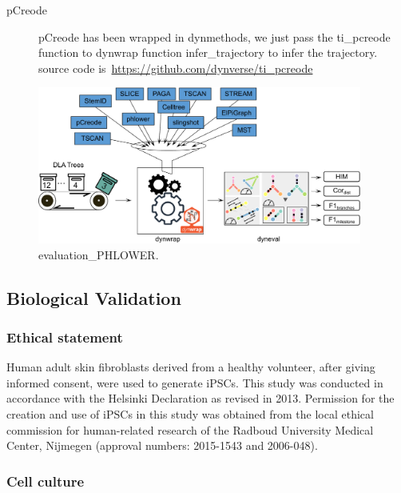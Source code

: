 \begin{description}
	\item[pCreode] 
	pCreode has been wrapped in dynmethods, we just pass the ti\_pcreode function to dynwrap function infer\_trajectory to infer the trajectory. source code is~\url{https://github.com/dynverse/ti\_pcreode}
\end{description}

\begin{figure}[!ht]
	\centering
	\includegraphics[width=0.95\textwidth]{evaluation_PHLOWER/fig}
	\vspace{0.1cm}
	\caption[evaluation\_PHLOWER]{
	evaluation\_PHLOWER.}
	\label{fig:evaluation_PHLOWER}
\end{figure}



\subsection{Biological Validation}


\subsubsection{Ethical statement}

Human adult skin fibroblasts derived from a healthy volunteer, after giving informed consent, were used to generate iPSCs. This study was conducted in accordance with the Helsinki Declaration as revised in 2013. Permission for the creation and use of iPSCs in this study was obtained from the local ethical commission for human-related research of the Radboud University Medical Center, Nijmegen (approval numbers: 2015-1543 and 2006-048). 

\subsubsection{Cell culture}

